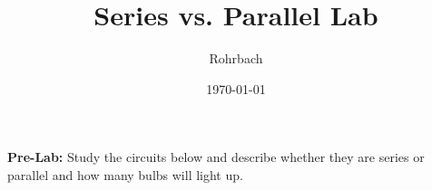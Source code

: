 \documentclass[10pt]{exam}
\title{Series vs. Parallel Lab}
\author{Rohrbach}
\date{\today}
\begin{document}
\maketitle

\begin{questions}
  \question
    \textbf{Pre-Lab:} Study the circuits below and describe whether they are series or parallel and how many bulbs will light up.

\end{questions}
\end{document}
